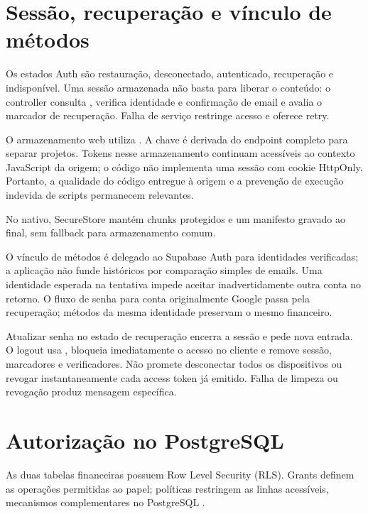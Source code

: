\documentclass[
    12pt,
    oneside,
    a4paper,
    brazil
]{abntex2}
\newcommand{\codigo}[1]{\texttt{\detokenize{#1}}}
\begin{document}
\section{Sessão, recuperação e vínculo de métodos}

Os estados Auth são restauração, desconectado, autenticado, recuperação e indisponível. Uma sessão armazenada não basta para liberar o conteúdo: o controller consulta \codigo{getUser}, verifica identidade e confirmação de email e avalia o marcador de recuperação. Falha de serviço restringe acesso e oferece retry.

O armazenamento web utiliza \codigo{localStorage}. A chave é derivada do endpoint completo para separar projetos. Tokens nesse armazenamento continuam acessíveis ao contexto JavaScript da origem; o código não implementa uma sessão com cookie HttpOnly. Portanto, a qualidade do código entregue à origem e a prevenção de execução indevida de scripts permanecem relevantes.

No nativo, SecureStore mantém chunks protegidos e um manifesto gravado ao final, sem fallback para armazenamento comum. 

O vínculo de métodos é delegado ao Supabase Auth para identidades verificadas; a aplicação não funde históricos por comparação simples de emails. Uma identidade esperada na tentativa impede aceitar inadvertidamente outra conta no retorno. O fluxo de senha para conta originalmente Google passa pela recuperação; métodos da mesma identidade preservam o mesmo \codigo{user_id} financeiro.

Atualizar senha no estado de recuperação encerra a sessão e pede nova entrada. O logout usa \codigo{scope: local}, bloqueia imediatamente o acesso no cliente e remove sessão, marcadores e verificadores. Não promete desconectar todos os dispositivos ou revogar instantaneamente cada access token já emitido. Falha de limpeza ou revogação produz mensagem específica.

\section{Autorização no PostgreSQL}

As duas tabelas financeiras possuem Row Level Security (RLS). Grants definem as operações permitidas ao papel; políticas restringem as linhas acessíveis, mecanismos complementares no PostgreSQL \cite{supabaseRls}.
\end{document}
